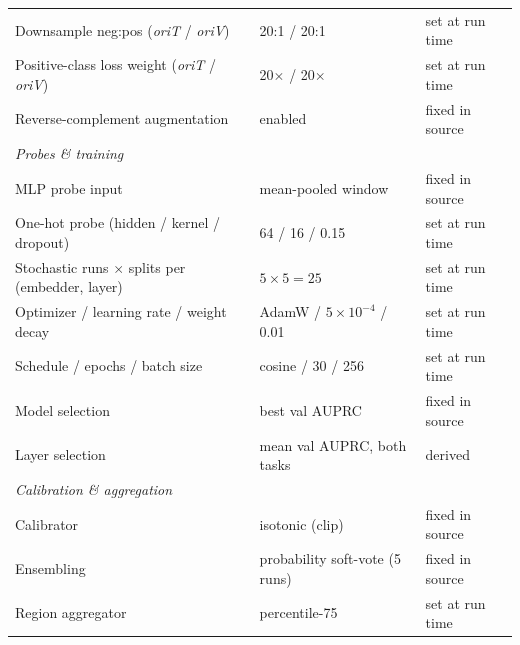 {\begin{longtable}{p{}p{}p{}}
Downsample neg:pos (\emph{oriT} / \emph{oriV}) & 20:1 / 20:1 & set at run time \\
Positive-class loss weight (\emph{oriT} / \emph{oriV}) & 20$\times$ / 20$\times$ & set at run time \\
Reverse-complement augmentation & enabled & fixed in source \\
\midrule
\multicolumn{3}{l}{\textit{Probes \& training}} \\
MLP probe input & mean-pooled window & fixed in source \\
One-hot probe (hidden / kernel / dropout) & 64 / 16 / 0.15 & set at run time \\
Stochastic runs $\times$ splits per (embedder, layer) & $5 \times 5 = 25$ & set at run time \\
Optimizer / learning rate / weight decay & AdamW / $5\times10^{-4}$ / 0.01 & set at run time \\
Schedule / epochs / batch size & cosine / 30 / 256 & set at run time \\
Model selection & best val AUPRC & fixed in source \\
Layer selection & mean val AUPRC, both tasks & derived \\
\midrule
\multicolumn{3}{l}{\textit{Calibration \& aggregation}} \\
Calibrator & isotonic (clip) & fixed in source \\
Ensembling & probability soft-vote (5 runs) & fixed in source \\
Region aggregator & percentile-75 & set at run time \\
\end{longtable}
}
